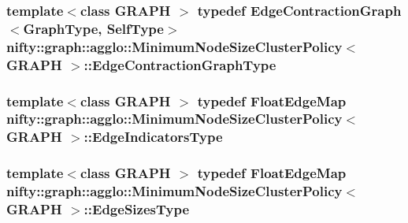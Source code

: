 \subsubsection[{Edge\+Contraction\+Graph\+Type}]{\setlength{\rightskip}{0pt plus 5cm}template$<$class G\+R\+A\+P\+H $>$ typedef {\bf Edge\+Contraction\+Graph}$<${\bf Graph\+Type}, {\bf Self\+Type}$>$ {\bf nifty\+::graph\+::agglo\+::\+Minimum\+Node\+Size\+Cluster\+Policy}$<$ G\+R\+A\+P\+H $>$\+::{\bf Edge\+Contraction\+Graph\+Type}}\label{classnifty_1_1graph_1_1agglo_1_1MinimumNodeSizeClusterPolicy_a5c67401c61d1d283b73c3ce8a31faeb9}
\hypertarget{classnifty_1_1graph_1_1agglo_1_1MinimumNodeSizeClusterPolicy_a81a0b54e4eadb98c9a125593b1c6e17c}{}
\subsubsection[{Edge\+Indicators\+Type}]{\setlength{\rightskip}{0pt plus 5cm}template$<$class G\+R\+A\+P\+H $>$ typedef Float\+Edge\+Map {\bf nifty\+::graph\+::agglo\+::\+Minimum\+Node\+Size\+Cluster\+Policy}$<$ G\+R\+A\+P\+H $>$\+::{\bf Edge\+Indicators\+Type}}\label{classnifty_1_1graph_1_1agglo_1_1MinimumNodeSizeClusterPolicy_a81a0b54e4eadb98c9a125593b1c6e17c}
\hypertarget{classnifty_1_1graph_1_1agglo_1_1MinimumNodeSizeClusterPolicy_a645ba7b5aabb0fd8cecad292041d929a}{}
\subsubsection[{Edge\+Sizes\+Type}]{\setlength{\rightskip}{0pt plus 5cm}template$<$class G\+R\+A\+P\+H $>$ typedef Float\+Edge\+Map {\bf nifty\+::graph\+::agglo\+::\+Minimum\+Node\+Size\+Cluster\+Policy}$<$ G\+R\+A\+P\+H $>$\+::{\bf Edge\+Sizes\+Type}}\label{classnifty_1_1graph_1_1agglo_1_1MinimumNodeSizeClusterPolicy_a645ba7b5aabb0fd8cecad292041d929a}
\hypertarget{classnifty_1_1graph_1_1agglo_1_1MinimumNodeSizeClusterPolicy_a6d81a64ca67c9feec052a031552282f0}{}
